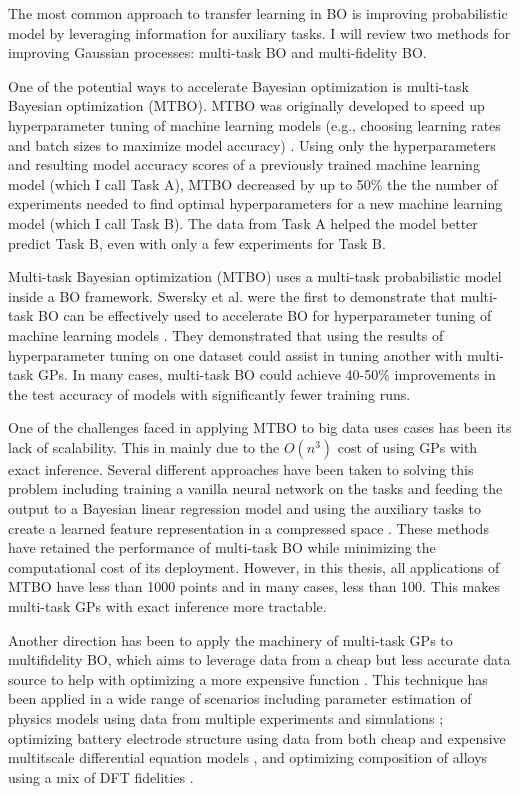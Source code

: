 The most common approach to transfer learning in BO is improving probabilistic model  by leveraging information for auxiliary tasks. I will review two methods for improving  Gaussian processes: multi-task BO and multi-fidelity BO.

One of the potential ways to accelerate Bayesian optimization is multi-task Bayesian optimization (MTBO). MTBO was originally developed to speed up hyperparameter tuning of machine learning models (e.g., choosing learning rates and batch sizes to maximize model accuracy) \cite{Swersky2013}. Using only the hyperparameters and resulting model accuracy scores of a previously trained machine learning model (which I call Task A),  MTBO decreased by up to 50\% the the number of experiments needed to find optimal hyperparameters for a new machine learning model (which I call Task B).  The data from Task A helped the model better predict Task B, even with only a few experiments for Task B.

Multi-task Bayesian optimization (MTBO) uses a multi-task probabilistic model inside a BO framework.  Swersky et al. were the first to demonstrate that multi-task BO can be effectively used to accelerate BO for hyperparameter tuning of machine learning models \cite{Swersky2013}. They demonstrated that using the results of hyperparameter tuning on one dataset could assist in tuning another with multi-task GPs. In many cases, multi-task BO could achieve 40-50\% improvements in the test accuracy of models with significantly fewer training runs.  

One of the challenges faced in applying MTBO to big data uses cases has been its lack of scalability. This in mainly due to the $O(n^3)$ cost of using GPs with exact inference. Several different approaches have been taken to solving this problem including training a vanilla neural network on the tasks and feeding the output to a Bayesian linear regression model \cite{Perrone2018} and using the auxiliary tasks to create a learned feature representation in a compressed space \cite{Hakhamaneshi2021}. These methods have retained the performance of multi-task BO while minimizing the computational cost of its deployment. However, in this thesis, all applications of MTBO have less than 1000 points and in many cases, less than 100. This makes multi-task GPs with exact inference more tractable.

Another direction has been to apply the machinery of multi-task GPs to multifidelity BO, which aims to leverage data from a cheap but less accurate data source to help with optimizing a more expensive function \cite{Huang2006, Forrester2007}. This technique has been applied in a wide range of scenarios including parameter estimation of physics models using data from multiple experiments and simulations \cite{Perdikaris2016}; optimizing battery electrode structure using data from both cheap and expensive multitscale differential equation models \cite{Pan2017, Folch2023}, and optimizing composition of alloys using a mix of DFT fidelities \cite{Tran2020}.

